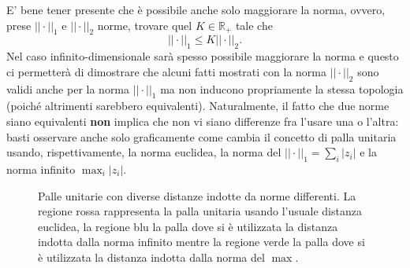 \documentclass[12pt, twoside, italian, openany]{book}
\begin{document}
	E' bene tener presente che è possibile anche solo maggiorare la norma, ovvero, prese $||\cdot||_1$ e $||\cdot||_2$ norme, trovare quel $K \in \mathbb{R}_{+}$ tale che
	$$
		||\cdot||_1 \leq K ||\cdot||_2.
	$$
	Nel caso infinito-dimensionale sarà spesso possibile maggiorare la norma e questo ci permetterà di dimostrare che alcuni fatti mostrati con la norma $||\cdot||_2$ sono validi anche per la norma $||\cdot||_1$ ma non inducono propriamente la stessa topologia (poiché altrimenti sarebbero equivalenti). Naturalmente, il fatto
	che due norme siano equivalenti \textbf{non} implica che non vi siano differenze fra l'usare una o l'altra: basti osservare anche solo graficamente come cambia il concetto di palla unitaria usando, rispettivamente, la norma euclidea, la norma del $||\cdot||_1 = \sum_i |z_i|$ e la norma infinito $\max_i |z_i|$.
	\begin{figure}[H]
		\centering
		\caption{Palle unitarie con diverse distanze indotte da norme differenti. La regione rossa rappresenta la palla unitaria usando l'usuale distanza euclidea, la regione blu la palla dove si è utilizzata la distanza indotta dalla norma infinito mentre la regione verde la palla dove si è utilizzata la distanza indotta dalla norma del $\max$.}
	\end{figure}
\end{document}
